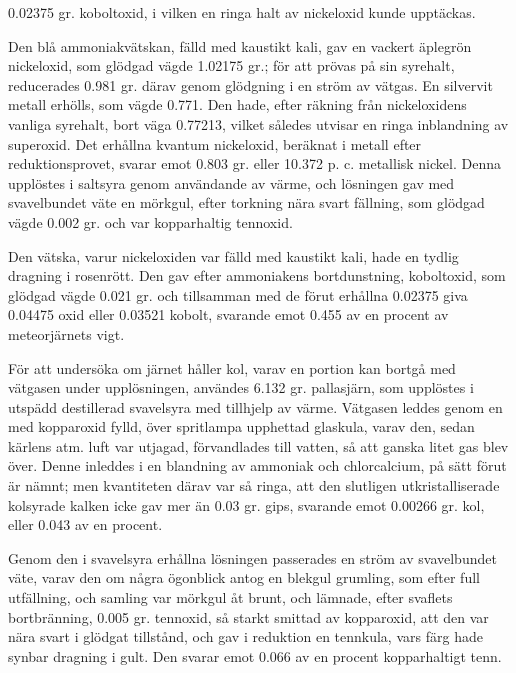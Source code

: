 \documentclass[a4paper, 12pt, oneside, swedish]{article}
\begin{document}
0.02375 gr. koboltoxid, i vilken en ringa halt av nickeloxid kunde upptäckas.

Den blå ammoniakvätskan, fälld med kaustikt kali, gav en vackert äplegrön nickeloxid, som glödgad vägde 1.02175 gr.; för att prövas på sin syrehalt, reducerades 0.981 gr. därav genom glödgning i en ström av vätgas. En silvervit metall erhölls, som vägde 0.771. Den hade, efter räkning från nickeloxidens vanliga syrehalt, bort väga 0.77213, vilket således utvisar en ringa inblandning av superoxid. Det erhållna kvantum nickeloxid, beräknat i metall efter reduktionsprovet, svarar emot 0.803 gr. eller 10.372 p. c. metallisk nickel. Denna upplöstes i saltsyra genom användande av värme, och lösningen gav med svavelbundet väte en mörkgul, efter torkning nära svart fällning, som glödgad vägde 0.002 gr. och var kopparhaltig tennoxid.

Den vätska, varur nickeloxiden var fälld med kaustikt kali, hade en tydlig dragning i rosenrött. Den gav efter ammoniakens bortdunstning, koboltoxid, som glödgad vägde 0.021 gr. och tillsamman med de förut erhållna 0.02375 giva 0.04475 oxid eller 0.03521 kobolt, svarande emot 0.455 av en procent av meteorjärnets vigt.

För att undersöka om järnet håller kol, varav en portion kan bortgå med vätgasen under upplösningen, användes 6.132 gr. pallasjärn, som upplöstes i utspädd destillerad svavelsyra med tillhjelp av värme. Vätgasen leddes genom en med kopparoxid fylld, över spritlampa upphettad glaskula, varav den, sedan kärlens atm. luft var utjagad, förvandlades till vatten, så att ganska litet gas blev över. Denne inleddes i en blandning av ammoniak och chlorcalcium, på sätt förut är nämnt; men kvantiteten därav var så ringa, att den slutligen utkristalliserade kolsyrade kalken icke gav mer än 0.03 gr. gips, svarande emot 0.00266 gr. kol, eller 0.043 av en procent.

Genom den i svavelsyra erhållna lösningen passerades en ström av svavelbundet väte, varav den om några ögonblick antog en blekgul grumling, som efter full utfällning, och samling var mörkgul åt brunt, och lämnade, efter svaflets bortbränning, 0.005 gr. tennoxid, så starkt smittad av kopparoxid, att den var nära svart i glödgat tillstånd, och gav i reduktion en tennkula, vars färg hade synbar dragning i gult. Den svarar emot 0.066 av en procent kopparhaltigt tenn.
\end{document}
